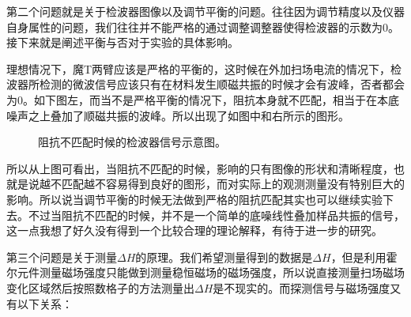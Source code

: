 \documentclass[aps,pre,12pt,preprint,onecolumn,showpacs,showkeys,UTF8]{article}
\begin{document}
第二个问题就是关于检波器图像以及调节平衡的问题。往往因为调节精度以及仪器自身属性的问题，我们往往并不能严格的通过调整调整器使得检波器的示数为0。接下来就是阐述平衡与否对于实验的具体影响。

理想情况下，魔T两臂应该是严格的平衡的，这时候在外加扫场电流的情况下，检波器所检测的微波信号应该只有在材料发生顺磁共振的时候才会有波峰，否者都会为0。如下图左，而当不是严格平衡的情况下，阻抗本身就不匹配，相当于在本底噪声之上叠加了顺磁共振的波峰。所以出现了如图中和右所示的图形。

\begin{figure}[h]
	\begin{center}
		\caption{\label{fig:exp3}阻抗不匹配时候的检波器信号示意图。}
	\end{center}
\end{figure}

所以从上图可看出，当阻抗不匹配的时候，影响的只有图像的形状和清晰程度，也就是说越不匹配越不容易得到良好的图形，而对实际上的观测测量没有特别巨大的影响。所以说当调节平衡的时候无法做到严格的阻抗匹配其实也可以继续实验下去。不过当阻抗不匹配的时候，并不是一个简单的底噪线性叠加样品共振的信号，这一点我想了好久没有得到一个比较合理的理论解释，有待于进一步的研究。

第三个问题是关于测量$\Delta H$的原理。我们希望测量得到的数据是$\Delta H$，但是利用霍尔元件测量磁场强度只能做到测量稳恒磁场的磁场强度，所以说直接测量扫场磁场变化区域然后按照数格子的方法测量出$\Delta H$是不现实的。而探测信号与磁场强度又有以下关系：
\end{document}
